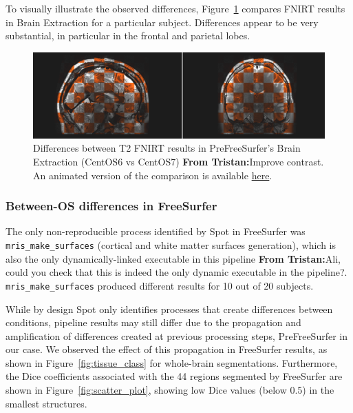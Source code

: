 \documentclass[a4paper,num-refs]{oup-contemporary}
\newcommand{\tristan}[1]{\color{blue}\textbf{From Tristan:}#1\color{black}}
\newcommand{\toolname}[0]{Spot\xspace}
\begin{document}
To visually illustrate the observed differences,
Figure~\ref{fig:fnirt_result} compares FNIRT results in Brain Extraction
for a particular subject. Differences appear to be very substantial, in
particular in the frontal and parietal lobes. 
\begin{figure}
  \centering
    \includegraphics[width=\columnwidth]{images/t2w_alignment.png} 
    \caption{Differences between T2 FNIRT results in PreFreeSurfer's Brain Extraction (CentOS6 vs 
    CentOS7) \tristan{Improve contrast}. An animated version of the comparison is available 
    \href{https://github.com/big-data-lab-team/HCP-reproducibility-paper/blob/master/images/pfs_t2w_alignment.gif}
    {here}.
} 
    \label{fig:fnirt_result}
\end{figure}


\subsubsection{Between-OS differences in FreeSurfer} 

The only non-reproducible process identified by \toolname in FreeSurfer was
\texttt{mris\_make\_surfaces} (cortical and white matter surfaces
generation), which is also the only dynamically-linked executable in this pipeline
\tristan{Ali, could you check that this is indeed the only dynamic
executable in the pipeline?}. \texttt{mris\_make\_surfaces} produced different results for
10 out of 20 subjects. 

While by design \toolname only identifies processes that create
differences between conditions, pipeline results may still differ due to
the propagation and amplification of differences created at previous
processing steps, PreFreeSurfer in our case. We observed the effect of this
propagation in FreeSurfer results, as shown in
Figure~\ref{fig:tissue_class} for whole-brain segmentations. Furthermore,
the Dice coefficients associated with the 44 regions segmented by
FreeSurfer are shown in Figure~\ref{fig:scatter_plot}, showing low Dice
values (below 0.5) in the smallest structures.
\end{document}
